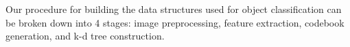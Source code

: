 Our procedure for building the data structures used for object classification can be broken down into 4 stages: image preprocessing, feature extraction, codebook generation, and k-d tree construction.